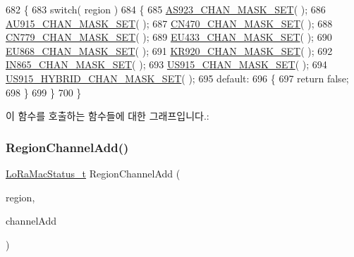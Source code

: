 \begin{DoxyCode}
682 \{
683     \textcolor{keywordflow}{switch}( region )
684     \{
685         \mbox{\hyperlink{_region_8c_a4722cdf1c3244ded88149e0cb0ef7792}{AS923\_CHAN\_MASK\_SET}}( );
686         \mbox{\hyperlink{_region_8c_a766153eeac1b275c09b19cc4b188adb3}{AU915\_CHAN\_MASK\_SET}}( );
687         \mbox{\hyperlink{_region_8c_a4f26fa505964e6e12dcafd6cf40c40b1}{CN470\_CHAN\_MASK\_SET}}( );
688         \mbox{\hyperlink{_region_8c_a62740b24d80ecf11c7af43f594046760}{CN779\_CHAN\_MASK\_SET}}( );
689         \mbox{\hyperlink{_region_8c_ae4e1241ba5c4670ced5b237fedcea81a}{EU433\_CHAN\_MASK\_SET}}( );
690         \mbox{\hyperlink{_region_8c_a9cc3111c3a3e5b8ae2f76f80cc2bb0a1}{EU868\_CHAN\_MASK\_SET}}( );
691         \mbox{\hyperlink{_region_8c_ad1ffb1cb808ec7ce907259b34e1c9dd3}{KR920\_CHAN\_MASK\_SET}}( );
692         \mbox{\hyperlink{_region_8c_a9424877e8dbdeaa1fe05b7577deb9ae3}{IN865\_CHAN\_MASK\_SET}}( );
693         \mbox{\hyperlink{_region_8c_a89a2c04d25ebfe579dfd9d6b509b1532}{US915\_CHAN\_MASK\_SET}}( );
694         \mbox{\hyperlink{_region_8c_a340f6d133f5d91d3779431bc3b1f9b47}{US915\_HYBRID\_CHAN\_MASK\_SET}}( );
695         \textcolor{keywordflow}{default}:
696         \{
697             \textcolor{keywordflow}{return} \textcolor{keyword}{false};
698         \}
699     \}
700 \}
\end{DoxyCode}
이 함수를 호출하는 함수들에 대한 그래프입니다.\+:
\mbox{\label{group___r_e_g_i_o_n_gaaa5767f33e988a641abf509ad278ae14}} 
\subsubsection{\texorpdfstring{Region\+Channel\+Add()}{RegionChannelAdd()}}
{\footnotesize\ttfamily \mbox{\hyperlink{group___l_o_r_a_m_a_c_ga30bd25657e10480f8605ee951b0ecfbd}{Lo\+Ra\+Mac\+Status\+\_\+t}} Region\+Channel\+Add (\begin{DoxyParamCaption}\item[{\mbox{\hyperlink{group___l_o_r_a_m_a_c_ga80c48efda9ae02e14b58160d34a798dd}{Lo\+Ra\+Mac\+Region\+\_\+t}}}]{region,  }\item[{\mbox{\hyperlink{group___r_e_g_i_o_n_gab1c5f3aa06614283202906cef4417860}{Channel\+Add\+Params\+\_\+t}} $\ast$}]{channel\+Add }\end{DoxyParamCaption})}



